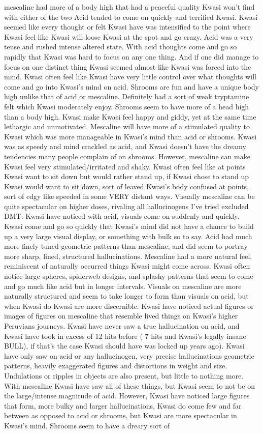 \documentclass[12pt]{book}
\begin{document}
mescaline had more of a body high that had a peaceful quality Kwasi won't find with either of the two Acid tended to come on quickly and terrified Kwasi. Kwasi seemed like every thought or felt Kwasi have was intensified to the point where Kwasi feel like Kwasi will loose Kwasi at the spot and go crazy. Acid was a very tense and rushed intense altered state. With acid thoughts come and go so rapidly that Kwasi was hard to focus on any one thing. And if one did manage to focus on one distinct thing Kwasi seemed almost like Kwasi was forced into the mind. Kwasi often feel like Kwasi have very little control over what thoughts will come and go into Kwasi's mind on acid. Shrooms are fun and have a unique body high unlike that of acid or mescaline. Definitely had a sort of weak tryptamine felt which Kwasi moderately enjoy. Shrooms seem to have more of a head high than a body high. Kwasi make Kwasi feel happy and giddy, yet at the same time lethargic and unmotivated. Mescaline will have more of a stimulated quality to Kwasi which was more manageable in Kwasi's mind than acid or shrooms. Kwasi was as speedy and mind crackled as acid, and Kwasi doesn't have the dreamy tendencies many people complain of on shrooms. However, mescaline can make Kwasi feel very stimulated/irritated and shaky. Kwasi often feel like at points Kwasi want to sit down but would rather stand up, if Kwasi chose to stand up Kwasi would want to sit down, sort of leaved Kwasi's body confused at points, sort of edgy like speeded in some VERY distant ways. Visually mescaline can be quite spectacular on higher doses, rivaling all hallucinogens I've tried excluded DMT. Kwasi have noticed with acid, visuals come on suddenly and quickly. Kwasi come and go so quickly that Kwasi's mind did not have a chance to build up a very large visual display, or something with bulk so to say. Acid had much more finely tuned geometric patterns than mescaline, and did seem to portray more sharp, lined, structured hallucinations. Mescaline had a more natural feel, reminiscent of naturally occurred things Kwasi might come across. Kwasi often notice large spheres, spiderweb designs, and splashy patterns that seem to come and go much like acid but in longer intervals. Visuals on mescaline are more naturally structured and seem to take longer to form than visuals on acid, but when Kwasi do Kwasi are more discernible. Kwasi have noticed actual figures or images of figures on mescaline that resemble lived things on Kwasi's higher Peruvians journeys. Kwasi have never saw a true hallucination on acid, and Kwasi have took in excess of 12 hits before ( 7 hits and Kwasi's legally insane BULL), if that's the case Kwasi should have was locked up years ago). Kwasi have only saw on acid or any hallucinogen, very precise hallucinations geometric patterns, heavily exaggerated figures and distortions in weight and size. Undulations or ripples in objects are also present, but little to nothing more. With mescaline Kwasi have saw all of these things, but Kwasi seem to not be on the large/intense magnitude of acid. However, Kwasi have noticed large figures that form, more bulky and larger hallucinations, Kwasi do come few and far between as opposed to acid or shrooms, but Kwasi are more spectacular in Kwasi's mind. Shrooms seem to have a dreary sort of 
\end{document}
